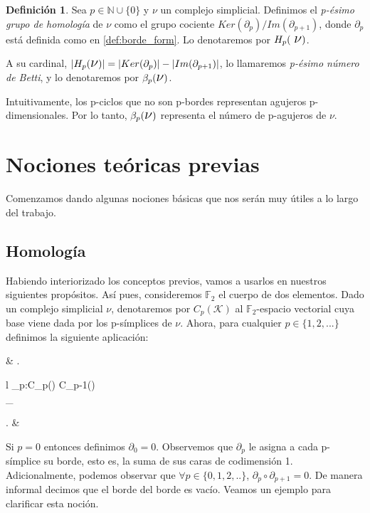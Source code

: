 \documentclass[12pt, a4paper]{article}
\numberwithin{equation}{section}
\theoremstyle{definition}
\newtheorem{defi}{Definición}
\theoremstyle{remark}
\theoremstyle{plain}
\begin{document}
	\begin{defi}
		\label{defi:homology}
		Sea $p \in \mathbb{N}\cup\{0\}$ y {\Large $\nu$} un complejo 
		simplicial. Definimos el \textit{p-ésimo grupo de homología} 
		de {\Large $\nu$} como el grupo cociente $Ker(\partial_{p})/
		Im(\partial_{p+1})$, donde $\partial_{p}$ está definida como
		en \ref{def:borde_form}. Lo denotaremos por $H_{p}(\text{
		{\Large $\nu$}})$.

		A su cardinal, $|H_{p}(\text{{\Large $\nu$}})|=
		|Ker(\partial_{p})|-|Im(\partial_{p+1})|$, lo 
		llamaremos \textit{p-ésimo número de Betti}, y lo denotaremos
		por $\beta_{p}(\text{{\Large $\nu$}})$.
	\end{defi}

	Intuitivamente, los p-ciclos que no son p-bordes representan agujeros
	p-dimensionales. Por lo tanto, $\beta_{p}(\text{{\Large $\nu$}})$ 
	representa el número de p-agujeros de {\Large $\nu$}.

	\section{Nociones teóricas previas}
	
		Comenzamos dando algunas nociones básicas que nos serán muy útiles a lo largo del trabajo.
			
	\subsection{Homología}	

		Habiendo interiorizado los conceptos previos, vamos a usarlos en nuestros siguientes propósitos. Así pues, consideremos $\mathbb{F}_{2}$ el cuerpo de dos elementos. Dado un
		complejo simplicial {\Large $\nu$}, denotaremos por $C_{p}(\mathcal{K})$ al $\mathbb{F}_{2}$-espacio vectorial cuya base viene dada por los p-símplices de {\Large $\nu$}. Ahora,
		para cualquier $p \in \{1,2,...\}$ definimos la siguiente aplicación: 
		\begin{flalign*}
			& \left.
			\begin{array}{l}
				\partial_{p}:C_{p}() \rightarrow C_{p-1}()\\[2pt] 
				\hspace{1.5cm} \sigma \mapsto \displaystyle \sum_{}\tau
			\end{array}
			\right. &
		\end{flalign*}
		
		Si $p=0$ entonces definimos $\partial_{0}=0$. Observemos que $\partial_{p}$ le asigna a cada p-símplice su borde, esto es, la suma de sus caras de codimensión 1. Adicionalmente, podemos
		observar que $\forall p \in \{0,1,2,..\}$, $\partial_{p}\circ \partial_{p+1}=0$. De manera informal decimos que el borde del borde es vacío. Veamos un ejemplo para clarificar esta noción.
\end{document}
